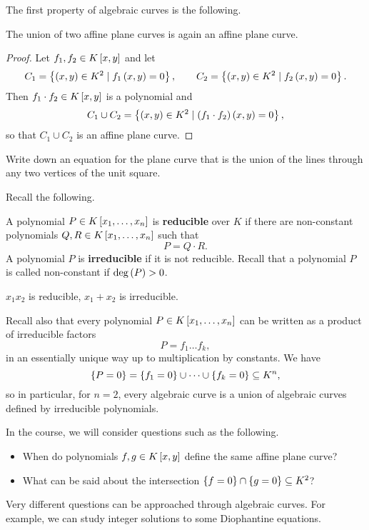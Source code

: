 The first property of algebraic curves is the following.

\begin{lemma}
\label{lem:1.7}
The union of two affine plane curves is again an affine plane curve.
\end{lemma}

\begin{proof}
Let $ f_1, f_2 \in K\sb{x, y} $ and let
$$ C_1 = \cb{\rb{x, y} \in K^2 \mid f_1\rb{x, y} = 0}, \qquad C_2 = \cb{\rb{x, y} \in K^2 \mid f_2\rb{x, y} = 0}. $$
Then $ f_1 \cdot f_2 \in K\sb{x, y} $ is a polynomial and
$$ C_1 \cup C_2 = \cb{\rb{x, y} \in K^2 \mid \rb{f_1 \cdot f_2}\rb{x, y} = 0}, $$
so that $ C_1 \cup C_2 $ is an affine plane curve.
\end{proof}

\begin{exercise}
Write down an equation for the plane curve that is the union of the lines through any two vertices of the unit square.
\end{exercise}

Recall the following.

\begin{definition}
A polynomial $ P \in K\sb{x_1, \dots, x_n} $ is \textbf{reducible} over $ K $ if there are non-constant polynomials $ Q, R \in K\sb{x_1, \dots, x_n} $ such that
$$ P = Q \cdot R. $$
A polynomial $ P $ is \textbf{irreducible} if it is not reducible. Recall that a polynomial $ P $ is called non-constant if $ \deg\rb{P} > 0 $.
\end{definition}

\begin{example*}
$ x_1x_2 $ is reducible, $ x_1 + x_2 $ is irreducible.
\end{example*}

\begin{remark}
Recall also that every polynomial $ P \in K\sb{x_1, \dots, x_n} $ can be written as a product of irreducible factors
$$ P = f_1 \dots f_k, $$
in an essentially unique way up to multiplication by constants. We have
$$ \cb{P = 0} = \cb{f_1 = 0} \cup \dots \cup \cb{f_k = 0} \subseteq K^n, $$
so in particular, for $ n = 2 $, every algebraic curve is a union of algebraic curves defined by irreducible polynomials.
\end{remark}

In the course, we will consider questions such as the following.
\begin{itemize}
\item When do polynomials $ f, g \in K\sb{x, y} $ define the same affine plane curve?
\item What can be said about the intersection $ \cb{f = 0} \cap \cb{g = 0} \subseteq K^2 $?
\end{itemize}
Very different questions can be approached through algebraic curves. For example, we can study integer solutions to some Diophantine equations.


